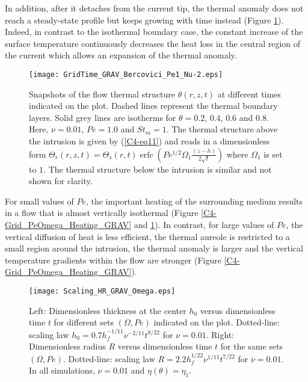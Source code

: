 In  addition, after  it detaches  from  the current  tip, the  thermal
anomaly does not  reach a steady-state profile but  keeps growing with
time instead (Figure \ref{C4-Grid_TIME_GRAV}).  Indeed, in contrast to
the isothermal  boundary case,  the constant  increase of  the surface
temperature continuously decreases the heat loss in the central region
of the current which allows an expansion of the thermal anomaly.
\begin{figure}[h!]
  \begin{center}
    \graphicspath{ {/Users/thorey/Documents/These/Projet/Refroidissement/Skin_Model/Figure/Figure_Heating/} }
    \texttt{[image: GridTime\_GRAV\_Bercovici\_Pe1\_Nu-2.eps]}
    \caption{Snapshots of  the flow thermal  structure $\theta(r,z,t)$
      at  different  times  indicated   on  the  plot.   Dashed  lines
      represent  the thermal  boundary  layers. Solid  grey lines  are
      isotherms for  $\theta =  0.2$, $0.4$,  $0.6$ and  $0.8$.  Here,
      $\nu=0.01$,  $Pe =1.0$  and $St_m  = 1$.  The thermal  structure
      above the intrusion  is given by (\ref{C4-eq11}) and  reads in a
      dimensionless                                               form
      $\Theta_r(r,z,t)=\Theta_s(r,t)\operatorname{erfc}{\left(Pe^{1/2}\Omega_1\frac{(z-h)}{2\sqrt{t}}\right)}$
      where $\Omega_1$ is set to  $1$. The thermal structure below the
      intrusion is similar and not shown for clarity.}
    \label{C4-Grid_TIME_GRAV}
  \end{center}
\end{figure}

For small  values of $Pe$,  the important heating of  the surrounding
medium results in a flow  that is almost vertically isothermal (Figure
\ref{C4-Grid_PeOmega_Heating_GRAV}  and \ref{C4-Grid_TIME_GRAV}).   In
contrast, for large values of $Pe$,  the vertical diffusion of heat is
less efficient,  the thermal aureole  is restricted to a  small region
around the intrusion,  the thermal anomaly is larger  and the vertical
temperature   gradients   within   the  flow   are   stronger   (Figure
\ref{C4-Grid_PeOmega_Heating_GRAV}).
\begin{figure}[h!]
  \begin{center}
    \graphicspath{ {/Users/thorey/Documents/These/Projet/Refroidissement/Skin_Model/Figure/Figure_Heating/} }
    \texttt{[image: Scaling\_HR\_GRAV\_Omega.eps]}
    \caption{Left: Dimensionless thickness at  the center $h_0$ versus
      dimensionless   time  $t$   for  different   sets  $(\Omega,Pe)$
      indicated    on   the    plot.     Dotted-line:   scaling    law
      $h_0=  0.7h_f^{-1/11}\nu^{-2/11}t^{8/22}$  for   $\nu  =  0.01$.
      Right: Dimensionless  radius $R$  versus dimensionless  time $t$
      for  the  same  sets $(\Omega,Pe)$.   Dotted-line:  scaling  law
      $R= 2.2h_f^{1/22}\nu^{1/11}t^{7/22}$  for $\nu = 0.01$.   In all
      simulations, $\nu=0.01$ and $\eta(\theta)=\eta_1$.}
    \label{C4-Scaling_HR_GRAV_Omega}
  \end{center}
\end{figure}

